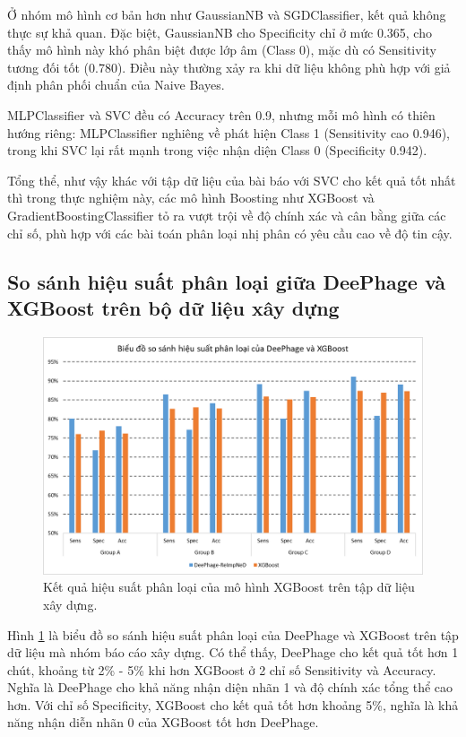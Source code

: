Ở nhóm mô hình cơ bản hơn như GaussianNB và SGDClassifier, kết quả không thực sự khả quan. Đặc biệt, GaussianNB cho Specificity chỉ ở mức 0.365, cho thấy mô hình này khó phân biệt được lớp âm (Class 0), mặc dù có Sensitivity tương đối tốt (0.780). Điều này thường xảy ra khi dữ liệu không phù hợp với giả định phân phối chuẩn của Naive Bayes.

MLPClassifier và SVC đều có Accuracy trên 0.9, nhưng mỗi mô hình có thiên hướng riêng: MLPClassifier nghiêng về phát hiện Class 1 (Sensitivity cao 0.946), trong khi SVC lại rất mạnh trong việc nhận diện Class 0 (Specificity 0.942).

Tổng thể, như vậy khác với tập dữ liệu của bài báo với SVC cho kết quả tốt nhất thì trong thực nghiệm này, các mô hình Boosting như XGBoost và GradientBoostingClassifier tỏ ra vượt trội về độ chính xác và cân bằng giữa các chỉ số, phù hợp với các bài toán phân loại nhị phân có yêu cầu cao về độ tin cậy. 

\subsection{So sánh hiệu suất phân loại giữa DeePhage và XGBoost trên bộ dữ liệu xây dựng}

\begin{figure}[H]
    \centering
    \includegraphics[width=1\linewidth]{figures/result_deephage_vs_xgboost.png}
    \caption{Kết quả hiệu suất phân loại của mô hình XGBoost trên tập dữ liệu xây dựng.}
    \label{fig:result_2}
\end{figure}

Hình \ref{fig:result_2} là biểu đồ so sánh hiệu suất phân loại của DeePhage và XGBoost trên tập dữ liệu mà nhóm báo cáo xây dựng. Có thể thấy, DeePhage cho kết quả tốt hơn 1 chút, khoảng từ 2\% - 5\% khi hơn XGBoost ở 2 chỉ số Sensitivity và Accuracy. Nghĩa là DeePhage cho khả năng nhận diện nhãn 1 và độ chính xác tổng thể cao hơn. Với chỉ số Specificity, XGBoost cho kết quả tốt hơn khoảng 5\%, nghĩa là khả năng nhận diễn nhãn 0 của XGBoost tốt hơn DeePhage.

